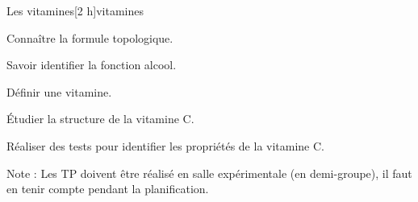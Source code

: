 \begin{multicols}{2}
  \begin{TP}{Les vitamines}[2 h]{vitamines}
    \begin{prerequis}
      \item Connaître la formule topologique.
      \item Savoir identifier la fonction alcool.
    \end{prerequis}
    \begin{objectifs}
      \item Définir une vitamine.
      \item Étudier la structure de la vitamine C.
      \item Réaliser des tests pour identifier les propriétés de la vitamine C.
    \end{objectifs}
  \end{TP}
\end{multicols}


Note :
Les TP doivent être réalisé en salle expérimentale (en demi-groupe), il faut en tenir compte pendant la planification.


\newpage
\nomPrenomClasse
{}
\vspace*{24pt}

\vspace*{-12.8 cm}

\begin{programmeSeance}
\end{programmeSeance}
\vspace*{1.2 cm}

